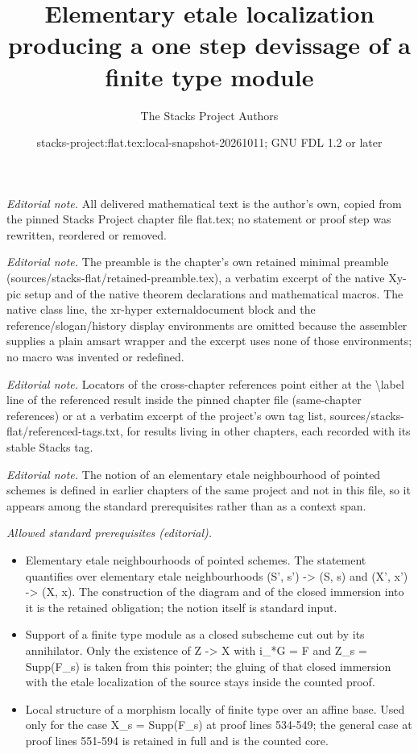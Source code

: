 \documentclass[10pt,a4paper]{amsart}
\title{Elementary etale localization producing a one step devissage of a finite type module}
\author{The Stacks Project Authors}
\date{stacks-project:flat.tex:local-snapshot-20261011; GNU FDL 1.2 or later}
\theoremstyle{plain}
\theoremstyle{definition}
\theoremstyle{remark}
\numberwithin{equation}{subsection}
\begin{document}
\maketitle
\noindent\textit{Editorial note.} All delivered mathematical text is the author's own, copied from the pinned Stacks Project chapter file flat.tex; no statement or proof step was rewritten, reordered or removed.\par\medskip
\noindent\textit{Editorial note.} The preamble is the chapter's own retained minimal preamble (sources/stacks-flat/retained-preamble.tex), a verbatim excerpt of the native Xy-pic setup and of the native theorem declarations and mathematical macros. The native class line, the xr-hyper externaldocument block and the reference/slogan/history display environments are omitted because the assembler supplies a plain amsart wrapper and the excerpt uses none of those environments; no macro was invented or redefined.\par\medskip
\noindent\textit{Editorial note.} Locators of the cross-chapter references point either at the \textbackslash{}label line of the referenced result inside the pinned chapter file (same-chapter references) or at a verbatim excerpt of the project's own tag list, sources/stacks-flat/referenced-tags.txt, for results living in other chapters, each recorded with its stable Stacks tag.\par\medskip
\noindent\textit{Editorial note.} The notion of an elementary etale neighbourhood of pointed schemes is defined in earlier chapters of the same project and not in this file, so it appears among the standard prerequisites rather than as a context span.\par\medskip
\noindent\textit{Allowed standard prerequisites (editorial).}\begin{itemize}
\item Elementary etale neighbourhoods of pointed schemes. The statement quantifies over elementary etale neighbourhoods (S', s') -> (S, s) and (X', x') -> (X, x). The construction of the diagram and of the closed immersion into it is the retained obligation; the notion itself is standard input.
\item Support of a finite type module as a closed subscheme cut out by its annihilator. Only the existence of Z -> X with i\_*G = F and Z\_s = Supp(F\_s) is taken from this pointer; the gluing of that closed immersion with the etale localization of the source stays inside the counted proof.
\item Local structure of a morphism locally of finite type over an affine base. Used only for the case X\_s = Supp(F\_s) at proof lines 534-549; the general case at proof lines 551-594 is retained in full and is the counted core.
\end{itemize}\medskip
\end{document}
